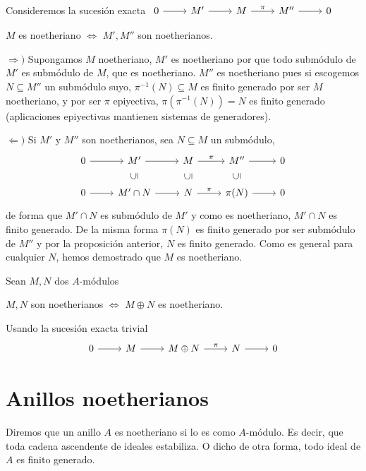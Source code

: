 Consideremos la sucesi\'on exacta 
$\bt 0 \rar &  M' \rar & M \rar{\pi} & M'' \rar & 0 \et$
\begin{prop}
    $M$ es noetheriano $\iff$ $M', M''$ son noetherianos.
\end{prop}
\begin{dem}
    $\Rightarrow)$ Supongamos $M$ noetheriano, $M'$ es noetheriano  por que todo subm\'odulo de $M'$ es subm\'odulo de $M$, que es noetheriano. $M''$ es noetheriano pues si escogemos $N \subseteq M''$ un subm\'odulo suyo, $\pi^{-1}(N) \subseteq M$ es finito generado por ser $M$ noetheriano, y por ser $\pi$ epiyectiva, $\pi(\pi^{-1}(N)) = N$ es finito generado (aplicaciones epiyectivas mantienen sistemas de generadores). 

    $\Leftarrow)$ Si $M'$ y $M''$ son noetherianos, sea $N \subseteq M$ un subm\'odulo, 
    $$\bt 0 \rar &  M' \rar & M \rar{\pi} & M'' \rar & 0  \\ 0 \rar &  M'\cap N \arrow[u, phantom, "{\rotatebox{90}{$\subseteq$}}"]\rar & N\arrow[u, phantom, "{\rotatebox{90}{$\subseteq$}}"] \rar{\pi} & \pi(N)\arrow[u, phantom, "{\rotatebox{90}{$\subseteq$}}"] \rar & 0  \et   $$
    de forma que $M' \cap N$ es subm\'odulo de $M'$ y como es noetheriano, $M' \cap N$ es finito generado. De la misma forma $\pi(N)$ es finito generado por ser subm\'odulo de $M''$ y por la proposici\'on anterior, $N$ es finito generado. Como es general para cualquier $N$, hemos demostrado que $M$ es noetheriano. 

\end{dem}
Sean $M, N$ dos $A$-m\'odulos
\begin{cor}
    $M,N$ son noetherianos $\iff$ $M \oplus N$ es noetheriano.
\end{cor}\begin{dem}
    Usando la sucesi\'on exacta trivial $$\bt 0 \rar &  M \rar & M\oplus N \rar{\pi} & N \rar & 0 \et$$
\end{dem}
\section{Anillos noetherianos}
\begin{defi}
    Diremos que un anillo $A$ es noetheriano si lo es como $A$-m\'odulo. Es decir, que toda cadena ascendente de ideales estabiliza. O dicho de otra forma, todo ideal de $A$ es finito generado.  
\end{defi}

